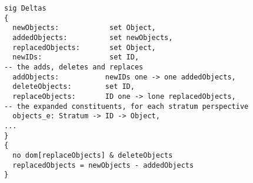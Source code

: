 \lstset{frame=tb, aboveskip=12pt, belowskip=-3pt, breaklines=true, basicstyle=\small\ttfamily, tabsize=2, mathescape=true}
\begin{lstlisting}[caption={base\_deltas.als, lines 5-41}, label=alloy:deltas, captionpos=b]
sig Deltas
{
  newObjects:            set Object,
  addedObjects:          set newObjects,
  replacedObjects:       set Object,
  newIDs:                set ID,
-- the adds, deletes and replaces 
  addObjects:           newIDs one -> one addedObjects,
  deleteObjects:        set ID,
  replaceObjects:       ID one -> lone replacedObjects,
-- the expanded constituents, for each stratum perspective
  objects_e: Stratum -> ID -> Object,
...
}
{
  no dom[replaceObjects] & deleteObjects
  replacedObjects = newObjects - addedObjects
}
\end{lstlisting}
